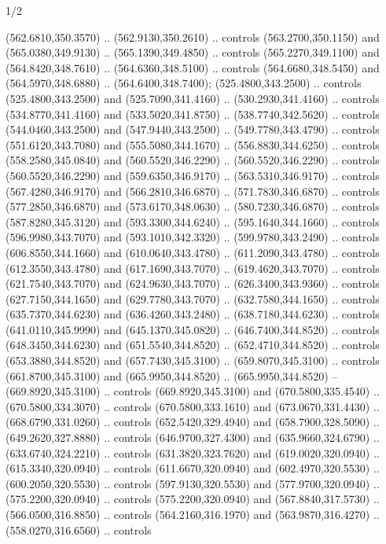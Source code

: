 \begin{flagdescription}{1/2}
\begin{scope}[xshift=0.5\flaglength,yshift=0.5\flagwidth,scale=\flagwidth/759]
\begin{scope}[y=0.8pt, x=0.8pt, yscale=-1,shift={(-720,-480)}]
\begin{scope}[cm={{1.14637,0.0,0.0,1.17117,(33.17849,82.1384)}}]
  (562.6810,350.3570) .. (562.9130,350.2610) .. controls (563.2700,350.1150) and
  (565.0380,349.9130) .. (565.1390,349.4850) .. controls (565.2270,349.1100) and
  (564.8420,348.7610) .. (564.6360,348.5100) .. controls (564.6680,348.5450) and
  (564.5970,348.6880) .. (564.6400,348.7400);
\path[fill=c557176] %
  (525.4800,343.2500) .. controls (525.4800,343.2500) and
  (525.7090,341.4160) .. (530.2930,341.4160) .. controls (534.8770,341.4160) and
  (533.5020,341.8750) .. (538.7740,342.5620) .. controls (544.0460,343.2500) and
  (547.9440,343.2500) .. (549.7780,343.4790) .. controls (551.6120,343.7080) and
  (555.5080,344.1670) .. (556.8830,344.6250) .. controls (558.2580,345.0840) and
  (560.5520,346.2290) .. (560.5520,346.2290) .. controls (560.5520,346.2290) and
  (559.6350,346.9170) .. (563.5310,346.9170) .. controls (567.4280,346.9170) and
  (566.2810,346.6870) .. (571.7830,346.6870) .. controls (577.2850,346.6870) and
  (573.6170,348.0630) .. (580.7230,346.6870) .. controls (587.8280,345.3120) and
  (593.3300,344.6240) .. (595.1640,344.1660) .. controls (596.9980,343.7070) and
  (593.1010,342.3320) .. (599.9780,343.2490) .. controls (606.8550,344.1660) and
  (610.0640,343.4780) .. (611.2090,343.4780) .. controls (612.3550,343.4780) and
  (617.1690,343.7070) .. (619.4620,343.7070) .. controls (621.7540,343.7070) and
  (624.9630,343.7070) .. (626.3400,343.9360) .. controls (627.7150,344.1650) and
  (629.7780,343.7070) .. (632.7580,344.1650) .. controls (635.7370,344.6230) and
  (636.4260,343.2480) .. (638.7180,344.6230) .. controls (641.0110,345.9990) and
  (645.1370,345.0820) .. (646.7400,344.8520) .. controls (648.3450,344.6230) and
  (651.5540,344.8520) .. (652.4710,344.8520) .. controls (653.3880,344.8520) and
  (657.7430,345.3100) .. (659.8070,345.3100) .. controls (661.8700,345.3100) and
  (665.9950,344.8520) .. (665.9950,344.8520) -- (669.8920,345.3100) .. controls
  (669.8920,345.3100) and (670.5800,335.4540) .. (670.5800,334.3070) .. controls
  (670.5800,333.1610) and (673.0670,331.4430) .. (668.6790,331.0260) .. controls
  (652.5420,329.4940) and (658.7900,328.5090) .. (649.2620,327.8880) .. controls
  (646.9700,327.4300) and (635.9660,324.6790) .. (633.6740,324.2210) .. controls
  (631.3820,323.7620) and (619.0020,320.0940) .. (615.3340,320.0940) .. controls
  (611.6670,320.0940) and (602.4970,320.5530) .. (600.2050,320.5530) .. controls
  (597.9130,320.5530) and (577.9700,320.0940) .. (575.2200,320.0940) .. controls
  (575.2200,320.0940) and (567.8840,317.5730) .. (566.0500,316.8850) .. controls
  (564.2160,316.1970) and (563.9870,316.4270) .. (558.0270,316.6560) .. controls

\end{scope}
\end{scope}
\end{scope}
\end{flagdescription}
